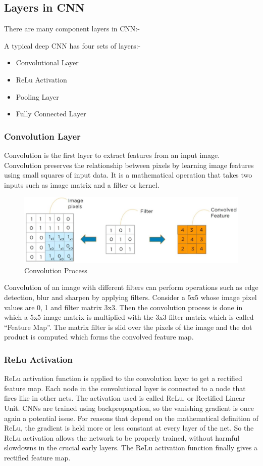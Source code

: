 \subsection{Layers in CNN}
There are many component layers in CNN:-

A typical deep CNN has four sets of layers:-
\begin{itemize}
\item{Convolutional Layer}
\item{ReLu Activation}
\item{Pooling Layer}
\item{Fully Connected Layer}
\end{itemize}

\subsubsection{Convolution Layer}
Convolution is the first layer to extract features from an input image. Convolution preserves the relationship between pixels by learning image features using small squares of input data. It is a mathematical operation that takes two inputs such as image matrix and a filter or kernel.
\begin{figure}[h]
	\label{ss}
	\centering
	\includegraphics[width= 13 cm]{convolutionlayer.jpg}
	\caption{Convolution Process}
\end{figure}

Convolution of an image with different filters can perform operations such as edge detection, blur and sharpen by applying filters.
Consider a 5x5 whose image pixel values are 0, 1 and filter matrix 3x3. Then the convolution process is done in which a 5x5 image matrix is multiplied with the 3x3 filter matrix which is called “Feature Map”.
The matrix filter is slid over the pixels of the image and the dot product is computed which forms the convolved feature map.

\subsubsection{ReLu Activation}
ReLu activation function is applied to the convolution layer to get a rectified feature map.
Each node in the convolutional layer is connected to a node that fires like in other nets. The activation used is called ReLu, or Rectified Linear Unit. CNNs are trained using backpropagation, so the vanishing gradient is once again a potential issue. For reasons that depend on the mathematical definition of ReLu, the gradient is held more or less constant at every layer of the net. So the ReLu activation allows the network to be properly trained, without harmful slowdowns in the crucial early layers. The ReLu activation function finally gives a rectified feature map.

